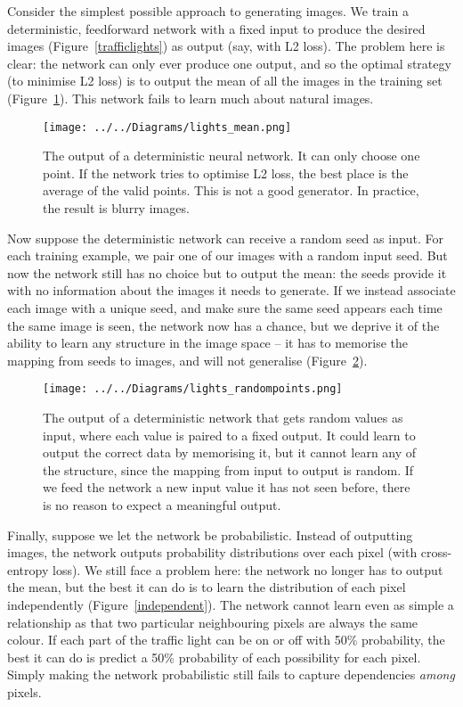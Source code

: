 \documentclass[11pt, a4paper, openany]{book}
\begin{document}
Consider the simplest possible approach to generating images. We train a deterministic, feedforward network with a fixed input to produce the desired images (Figure~\ref{trafficlights}) as output (say, with L2 loss). The problem here is clear: the network can only ever produce one output, and so the optimal strategy (to minimise L2 loss) is to output the mean of all the images in the training set (Figure~\ref{lightsmean}). This network fails to learn much about natural images.

\begin{figure}
  \centering
  \texttt{[image: ../../Diagrams/lights\_mean.png]}
  \caption[Output of a deterministic neural network]{The output of a deterministic neural network. It can only choose one point. If the network tries to optimise L2 loss, the best place is the average of the valid points. This is not a good generator. In practice, the result is blurry images.}
  \label{lightsmean}
\end{figure}

Now suppose the deterministic network can receive a random seed as input. For each training example, we pair one of our images with a random input seed. But now the network still has no choice but to output the mean: the seeds provide it with no information about the images it needs to generate. If we instead associate each image with a unique seed, and make sure the same seed appears each time the same image is seen, the network now has a chance, but we deprive it of the ability to learn any structure in the image space -- it has to memorise the mapping from seeds to images, and will not generalise (Figure~\ref{randompoints}).

\begin{figure}
  \centering
  \texttt{[image: ../../Diagrams/lights\_randompoints.png]}
  \caption[Output of a deterministic network with random values as input]{The output of a deterministic network that gets random values as input, where each value is paired to a fixed output. It could learn to output the correct data by memorising it, but it cannot learn any of the structure, since the mapping from input to output is random. If we feed the network a new input value it has not seen before, there is no reason to expect a meaningful output.}
  \label{randompoints}
\end{figure}

Finally, suppose we let the network be probabilistic. Instead of outputting images, the network outputs probability distributions over each pixel (with cross-entropy loss). We still face a problem here: the network no longer has to output the mean, but the best it can do is to learn the distribution of each pixel independently (Figure~\ref{independent}). The network cannot learn even as simple a relationship as that two particular neighbouring pixels are always the same colour. If each part of the traffic light can be on or off with 50\% probability, the best it can do is predict a 50\% probability of each possibility for each pixel. Simply making the network probabilistic still fails to capture dependencies \emph{among} pixels.
\end{document}
